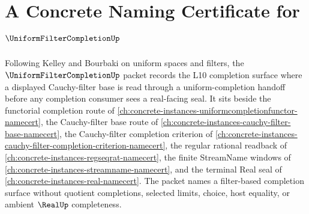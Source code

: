 \chapter{A Concrete Naming Certificate for $\UniformFilterCompletionUp$}
\label{ch:concrete-instances-uniform-filter-completion-namecert}

Following Kelley and Bourbaki on uniform spaces and filters, the $\UniformFilterCompletionUp$ packet records the L10 completion surface where a displayed Cauchy-filter base is read through a uniform-completion handoff before any completion consumer sees a real-facing seal. It sits beside the functorial completion route of \autoref{ch:concrete-instances-uniformcompletionfunctor-namecert}, the Cauchy-filter base route of \autoref{ch:concrete-instances-cauchy-filter-base-namecert}, the Cauchy-filter completion criterion of \autoref{ch:concrete-instances-cauchy-filter-completion-criterion-namecert}, the regular rational readback of \autoref{ch:concrete-instances-regseqrat-namecert}, the finite StreamName windows of \autoref{ch:concrete-instances-streamname-namecert}, and the terminal Real seal of \autoref{ch:concrete-instances-real-namecert}. The packet names a filter-based completion surface without quotient completions, selected limits, choice, host equality, or ambient $\RealUp$ completeness.

